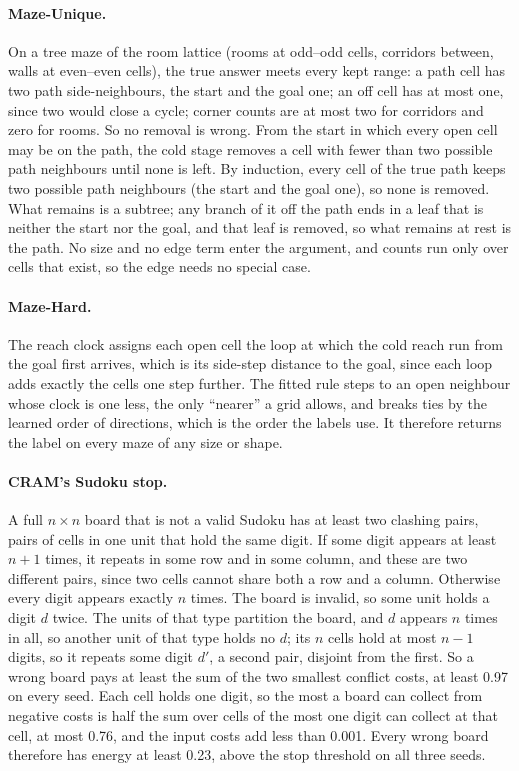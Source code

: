 \documentclass[10pt]{article}
\begin{document}
\paragraph{Maze-Unique.} On a tree maze of the room lattice (rooms at odd--odd cells, corridors between, walls at
even--even cells), the true answer meets every kept range: a path cell has two path side-neighbours, the start and the
goal one; an off cell has at most one, since two would close a cycle; corner counts are at most two for corridors and
zero for rooms. So no removal is wrong. From the start in which every open cell may be on the path, the cold stage removes
a cell with fewer than two possible path neighbours until none is left. By induction, every cell of the true path keeps
two possible path neighbours (the start and the goal one), so none is removed. What remains is a subtree; any branch of
it off the path ends in a leaf that is neither the start nor the goal, and that leaf is removed, so what remains at rest
is the path. No size and no edge term enter the argument, and counts run only over cells
that exist, so the edge needs no special case.

\paragraph{Maze-Hard.} The reach clock assigns each open cell the loop at which the cold reach run from the goal first
arrives, which is its side-step distance to the goal, since each loop adds exactly the cells one step further. The fitted
rule steps to an open neighbour whose clock is one less, the only ``nearer'' a grid allows, and breaks ties by the learned
order of directions, which is the order the labels use. It therefore returns the label on every maze of any size or shape.

\paragraph{CRAM's Sudoku stop.} A full $n\times n$ board that is not a valid Sudoku has at least two clashing pairs,
pairs of cells in one unit that hold the same digit. If some digit appears at least $n+1$ times, it repeats in some row
and in some column, and these are two different pairs, since two cells cannot share both a row and a column. Otherwise
every digit appears exactly $n$ times. The board is invalid, so some unit holds a digit $d$ twice. The units of that type
partition the board, and $d$ appears $n$ times in all, so another unit of that type holds no $d$; its $n$ cells hold at
most $n-1$ digits, so it repeats some digit $d'$, a second pair, disjoint from the first. So a wrong board pays at least the sum of the two smallest conflict costs, at least 0.97 on every seed.
Each cell holds one digit, so the most a board can collect from negative costs is half the sum over cells of the most
one digit can collect at that cell, at most 0.76, and the input costs add less than 0.001. Every wrong
board therefore has energy at least 0.23, above the stop threshold on all three seeds.
\end{document}

